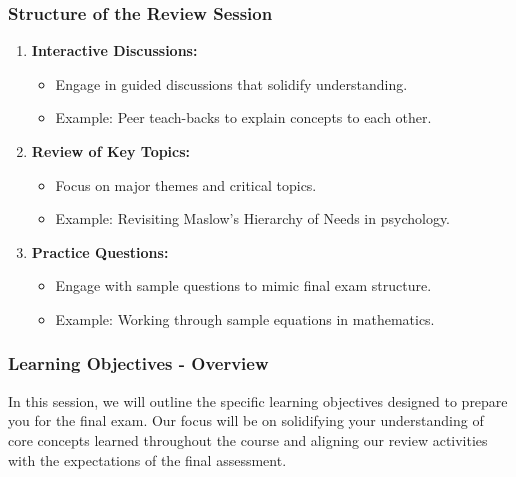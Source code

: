 \documentclass{beamer}
\begin{document}
\begin{frame}[fragile]
    \frametitle{Structure of the Review Session}
    \begin{enumerate}
        \item \textbf{Interactive Discussions:}
        \begin{itemize}
            \item Engage in guided discussions that solidify understanding.
            \item Example: Peer teach-backs to explain concepts to each other.
        \end{itemize}
        
        \item \textbf{Review of Key Topics:}
        \begin{itemize}
            \item Focus on major themes and critical topics.
            \item Example: Revisiting Maslow’s Hierarchy of Needs in psychology.
        \end{itemize}
        
        \item \textbf{Practice Questions:}
        \begin{itemize}
            \item Engage with sample questions to mimic final exam structure.
            \item Example: Working through sample equations in mathematics.
        \end{itemize}
    \end{enumerate}
\end{frame}

\begin{frame}[fragile]
    \frametitle{Learning Objectives - Overview}
    In this session, we will outline the specific learning objectives designed to prepare you for the final exam. Our focus will be on solidifying your understanding of core concepts learned throughout the course and aligning our review activities with the expectations of the final assessment.
\end{frame}
\end{document}
